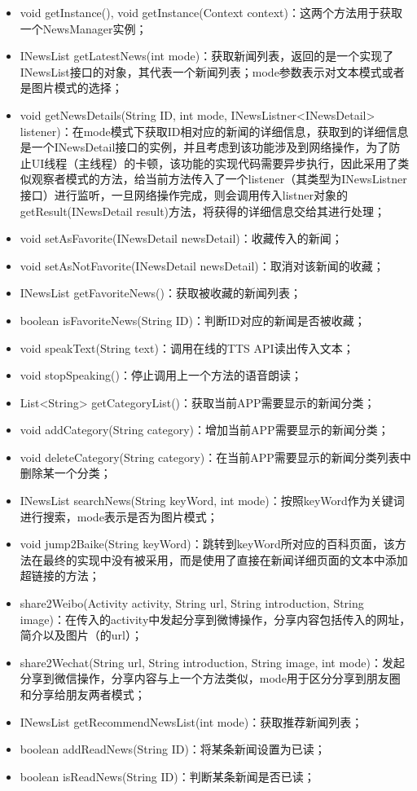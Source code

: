 \documentclass[UTF8]{ctexart}
\begin{document}
	\begin{itemize}
		\item void getInstance(), void getInstance(Context context)：这两个方法用于获取一个NewsManager实例；
		\item INewsList getLatestNews(int mode)：获取新闻列表，返回的是一个实现了INewsList接口的对象，其代表一个新闻列表；mode参数表示对文本模式或者是图片模式的选择；
		\item void getNewsDetails(String ID, int mode, INewsListner<INewsDetail> listener)：在mode模式下获取ID相对应的新闻的详细信息，获取到的详细信息是一个INewsDetail接口的实例，并且考虑到该功能涉及到网络操作，为了防止UI线程（主线程）的卡顿，该功能的实现代码需要异步执行，因此采用了类似观察者模式的方法，给当前方法传入了一个listener（其类型为INewsListner接口）进行监听，一旦网络操作完成，则会调用传入listner对象的getResult(INewsDetail result)方法，将获得的详细信息交给其进行处理；
		\item void setAsFavorite(INewsDetail newsDetail)：收藏传入的新闻；
		\item void setAsNotFavorite(INewsDetail newsDetail)：取消对该新闻的收藏；
		\item INewsList getFavoriteNews()：获取被收藏的新闻列表；
		\item boolean isFavoriteNews(String ID)：判断ID对应的新闻是否被收藏；
		\item void speakText(String text)：调用在线的TTS API读出传入文本；
		\item void stopSpeaking()：停止调用上一个方法的语音朗读；
		\item List<String> getCategoryList()：获取当前APP需要显示的新闻分类；
		\item void addCategory(String category)：增加当前APP需要显示的新闻分类；
		\item void deleteCategory(String category)：在当前APP需要显示的新闻分类列表中删除某一个分类；
		\item INewsList searchNews(String keyWord, int mode)：按照keyWord作为关键词进行搜索，mode表示是否为图片模式；
		\item void jump2Baike(String keyWord)：跳转到keyWord所对应的百科页面，该方法在最终的实现中没有被采用，而是使用了直接在新闻详细页面的文本中添加超链接的方法；
		\item share2Weibo(Activity activity, String url, String introduction, String image)：在传入的activity中发起分享到微博操作，分享内容包括传入的网址，简介以及图片（的url）；
		\item share2Wechat(String url, String introduction, String image, int mode)：发起分享到微信操作，分享内容与上一个方法类似，mode用于区分分享到朋友圈和分享给朋友两者模式；
		\item INewsList getRecommendNewsList(int mode)：获取推荐新闻列表；
		\item boolean addReadNews(String ID)：将某条新闻设置为已读；
		\item boolean isReadNews(String ID)：判断某条新闻是否已读；
	\end{itemize}
\end{document}
